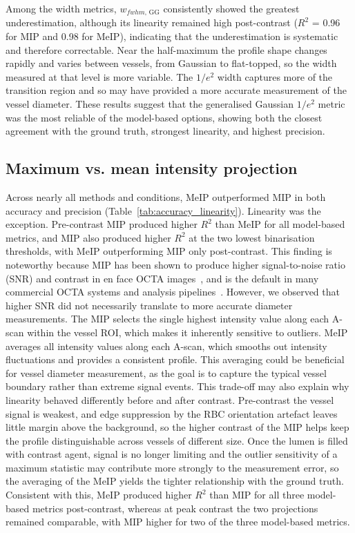 Among the width metrics, $w_{fwhm,\,\mathrm{GG}}$ consistently showed the greatest underestimation, although its linearity remained high post-contrast ($R^2$ = 0.96 for MIP and 0.98 for MeIP), indicating that the underestimation is systematic and therefore correctable. Near the half-maximum the profile shape changes rapidly and varies between vessels, from Gaussian to flat-topped, so the width measured at that level is more variable. The $1/e^2$ width captures more of the transition region and so may have provided a more accurate measurement of the vessel diameter. These results suggest that the generalised Gaussian $1/e^2$ metric was the most reliable of the model-based options, showing both the closest agreement with the ground truth, strongest linearity, and highest precision.

\subsection{Maximum vs. mean intensity projection}
\label{subsec:max_vs_mean}
Across nearly all methods and conditions, MeIP outperformed MIP in both accuracy and precision (Table~\ref{tab:accuracy_linearity}). Linearity was the exception. Pre-contrast MIP produced higher $R^2$ than MeIP for all model-based metrics, and MIP also produced higher $R^2$ at the two lowest binarisation thresholds, with MeIP outperforming MIP only post-contrast.  This finding is noteworthy because MIP has been shown to produce higher signal-to-noise ratio (SNR) and contrast in en face OCTA images~\cite{hormelMaximumValueProjection2018}, and is the default in many commercial OCTA systems and analysis pipelines~\cite{sampsonTowardsStandardizingRetinal2022,untrachtTowardsStandardisingRetinal2024}. However, we observed that higher SNR did not necessarily translate to more accurate diameter measurements. The MIP selects the single highest intensity value along each A-scan within the vessel ROI, which makes it inherently sensitive to outliers. MeIP averages all intensity values along each A-scan, which smooths out intensity fluctuations and provides a consistent profile. This averaging could be beneficial for vessel diameter measurement, as the goal is to capture the typical vessel boundary rather than extreme signal events. This trade-off may also explain why linearity behaved differently before and after contrast. Pre-contrast the vessel signal is weakest, and edge suppression by the RBC orientation artefact leaves little margin above the background, so the higher contrast of the MIP helps keep the profile distinguishable across vessels of different size. Once the lumen is filled with contrast agent, signal is no longer limiting and the outlier sensitivity of a maximum statistic may contribute more strongly to the measurement error, so the averaging of the MeIP yields the tighter relationship with the ground truth. Consistent with this, MeIP produced higher $R^2$ than MIP for all three model-based metrics post-contrast, whereas at peak contrast the two projections remained comparable, with MIP higher for two of the three model-based metrics.

